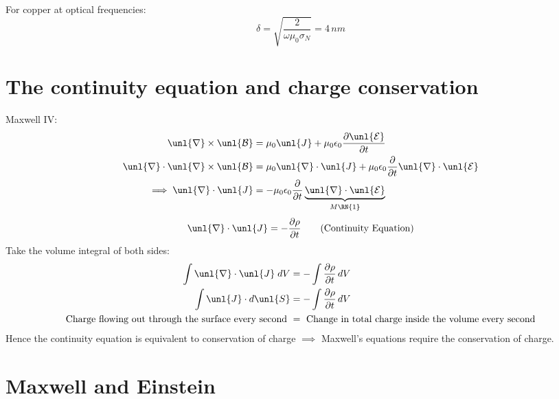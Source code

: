 \documentclass[a4paper, 11pt, normalem]{report}
\newcommand\p{\partial}
\newcommand\E{\mathcal{E}}
\newcommand\uE{\unl{\E}}
\newcommand\B{\mathcal{B}}
\newcommand\uB{\unl{\B}}
\newcommand\del{\unl{\nabla}}
\newcommand\eno{\epsilon_0}
\newcommand\om{\omega}
\newcommand\J{\unl{J}}
\begin{document}
For copper at optical frequencies:
\begin{equation}
    \delta = \sqrt{\frac{2}{\om\mu_0\sigma_N}} = 4\,nm
\end{equation}

\section{The continuity equation and charge conservation}
Maxwell \RN{4}:
\begin{align}
    \del\times\uB &= \mu_0\J + \mu_0\eno\frac{\p\uE}{\p t} \\
    \del\cdot\del\times\uB &= \mu_0\del\cdot\J + \mu_0\eno\frac{\p}{\p t}\del\cdot\uE \\
    \implies \del\cdot\J &= -\mu_0\eno\frac{\p}{\p t}\underbrace{\del\cdot\uE}_{M\RN{1}}
\end{align}
\begin{equation}
    \del\cdot\J = -\frac{\p\rho}{\p t} \tag{Continuity Equation}
\end{equation}
Take the volume integral of both sides:
\begin{align}
    \int \del\cdot\J\;dV &= -\int \frac{\p\rho}{\p t}\,dV \\
    \int \J \cdot d\unl{S} &= -\int \frac{\p\rho}{\p t}\,dV \\
    \text{Charge flowing out through the surface every second } &= \text{ Change in total charge inside the volume every second}
\end{align}
Hence the continuity equation is equivalent to conservation of charge $\implies$ Maxwell's equations require the conservation of charge.

\section{Maxwell and Einstein}
\end{document}

